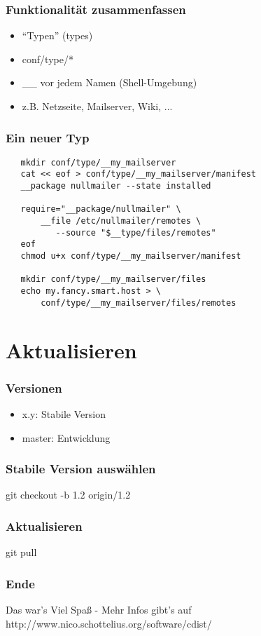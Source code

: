 \documentclass{beamer}
\begin{document}
\frame
{
  \frametitle{Funktionalität zusammenfassen}
  \begin{itemize}[<+->]
     \item "`Typen"' (types)
     \item conf/type/*
     \item \_\_ vor jedem Namen (Shell-Umgebung)
     \item z.B. Netzseite, Mailserver, Wiki, ...
  \end{itemize}
}

\begin{frame}[fragile]
   \frametitle{Ein neuer Typ}
   \begin{small}
   \begin{verbatim}
   mkdir conf/type/__my_mailserver
   cat << eof > conf/type/__my_mailserver/manifest
   __package nullmailer --state installed

   require="__package/nullmailer" \
       __file /etc/nullmailer/remotes \
          --source "$__type/files/remotes"
   eof
   chmod u+x conf/type/__my_mailserver/manifest

   mkdir conf/type/__my_mailserver/files
   echo my.fancy.smart.host > \
       conf/type/__my_mailserver/files/remotes
   \end{verbatim}
   \end{small}
\end{frame}

\section{Aktualisieren}
\begin{frame}[fragile]
  \frametitle{Versionen}
  \begin{itemize}[<+->]
     \item x.y: Stabile Version
     \item master: Entwicklung
  \end{itemize}
\end{frame}

\begin{frame}[fragile]
  \frametitle{Stabile Version auswählen}
  \begin{center}
  git checkout -b 1.2 origin/1.2
  \end{center}
\end{frame}

\begin{frame}[fragile]
  \frametitle{Aktualisieren}
  \begin{center}
  git pull
  \end{center}
\end{frame}

\frame
{
  \frametitle{Ende}
  \begin{block}{Das war's}
  Viel Spaß - Mehr Infos gibt's auf http://www.nico.schottelius.org/software/cdist/
  \end{block}
}
\end{document}
